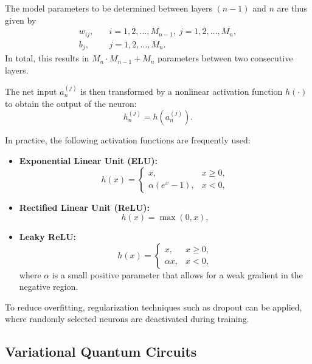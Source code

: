 The model parameters to be determined between layers $(n-1)$ and $n$ are thus given by
\begin{align}
w_{ij}, \quad & i = 1,2,\ldots,M_{n-1}, \; j = 1,2,\ldots,M_n, \\
b_j, \quad & j = 1,2,\ldots,M_n.
\end{align}
In total, this results in $M_n \cdot M_{n-1} + M_n$ parameters between two consecutive layers.

The net input $a_n^{(j)}$ is then transformed by a nonlinear activation function $h(\cdot)$ to obtain the output of the neuron:
\begin{equation}
h_n^{(j)} = h\left(a_n^{(j)}\right).
\end{equation}

In practice, the following activation functions are frequently used:
\begin{itemize}
    \item \textbf{Exponential Linear Unit (ELU):}
    \begin{equation}
        h(x) =
        \begin{cases}
            x, & x \ge 0, \\
            \alpha \left( e^{x} - 1 \right), & x < 0,
        \end{cases}
    \end{equation}
    \item \textbf{Rectified Linear Unit (ReLU):}
    \begin{equation}
        h(x) = \max(0, x),
    \end{equation}
    \item \textbf{Leaky ReLU:}
    \begin{equation}
        h(x) =
        \begin{cases}
            x, & x \ge 0, \\
            \alpha x, & x < 0,
        \end{cases}
    \end{equation}
    where $\alpha$ is a small positive parameter that allows for a weak gradient in the negative region.
\end{itemize}

To reduce overfitting, regularization techniques such as dropout can be applied, where randomly selected neurons are deactivated during training.

\subsection{Variational Quantum Circuits}
\label{sec:bg-vqc}

